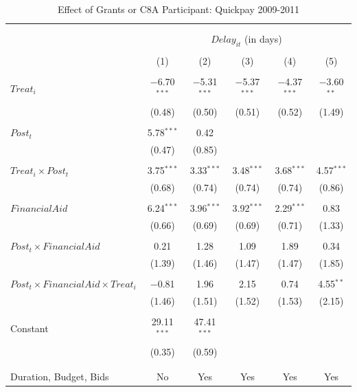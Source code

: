 \documentclass[
]{article}
\begin{document}
\begin{table}[H] \centering 
  \caption{Effect of Grants or C8A Participant: Quickpay 2009-2011} 
  \label{} 
\small 
\begin{tabular}{@{\extracolsep{-2pt}}lccccc} 
\\[-1.8ex]\hline 
\hline \\[-1.8ex] 
\\[-1.8ex] & \multicolumn{5}{c}{$Delay_{it}$ (in days)} \\ 
\\[-1.8ex] & (1) & (2) & (3) & (4) & (5)\\ 
\hline \\[-1.8ex] 
 $Treat_i$ & $-$6.70$^{***}$ & $-$5.31$^{***}$ & $-$5.37$^{***}$ & $-$4.37$^{***}$ & $-$3.60$^{**}$ \\ 
  & (0.48) & (0.50) & (0.51) & (0.52) & (1.49) \\ 
  & & & & & \\ 
 $Post_t$ & 5.78$^{***}$ & 0.42 &  &  &  \\ 
  & (0.47) & (0.85) &  &  &  \\ 
  & & & & & \\ 
 $Treat_i \times Post_t$ & 3.75$^{***}$ & 3.33$^{***}$ & 3.48$^{***}$ & 3.68$^{***}$ & 4.57$^{***}$ \\ 
  & (0.68) & (0.74) & (0.74) & (0.74) & (0.86) \\ 
  & & & & & \\ 
 $FinancialAid$ & 6.24$^{***}$ & 3.96$^{***}$ & 3.92$^{***}$ & 2.29$^{***}$ & 0.83 \\ 
  & (0.66) & (0.69) & (0.69) & (0.71) & (1.33) \\ 
  & & & & & \\ 
 $Post_t \times FinancialAid$ & 0.21 & 1.28 & 1.09 & 1.89 & 0.34 \\ 
  & (1.39) & (1.46) & (1.47) & (1.47) & (1.85) \\ 
  & & & & & \\ 
 $Post_t \times FinancialAid \times Treat_i$ & $-$0.81 & 1.96 & 2.15 & 0.74 & 4.55$^{**}$ \\ 
  & (1.46) & (1.51) & (1.52) & (1.53) & (2.15) \\ 
  & & & & & \\ 
 Constant & 29.11$^{***}$ & 47.41$^{***}$ &  &  &  \\ 
  & (0.35) & (0.59) &  &  &  \\ 
  & & & & & \\ 
\hline \\[-1.8ex] 
Duration, Budget, Bids & No & Yes & Yes & Yes & Yes \\ 

\end{tabular}
\end{table}
\end{document}
